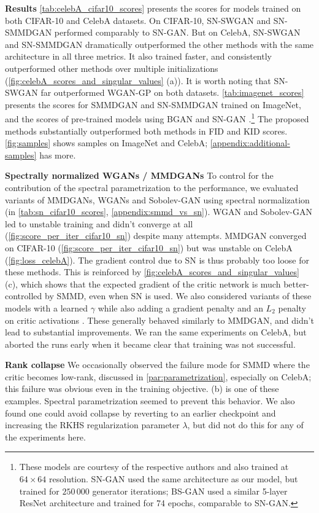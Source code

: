 \documentclass{article}
\let\citep\parencite
\begin{document}
\textbf{Results}
\cref{tab:celebA_cifar10_scores} presents the scores for models trained on both CIFAR-10 and CelebA datasets. On CIFAR-10,  SN-SWGAN and  SN-SMMDGAN performed comparably to SN-GAN. But on CelebA,
SN-SWGAN and SN-SMMDGAN dramatically outperformed the other methods with the same architecture in all three metrics. It also trained faster, and consistently outperformed other methods over multiple initializations (\cref{fig:celebA_scores_and_singular_values} (a)).
It is worth noting that SN-SWGAN far outperformed WGAN-GP on both datasets.
\cref{tab:imagenet_scores} presents the scores for SMMDGAN and SN-SMMDGAN trained on ImageNet,
and the scores of pre-trained models using BGAN \citep{began} and SN-GAN \citep{Miyato:2018}.\footnote{These models are courtesy of the respective authors and also trained at $64 \times 64$ resolution. SN-GAN used the same architecture as our model, but trained for $250\,000$ generator iterations; BS-GAN used a similar 5-layer ResNet architecture and trained for 74 epochs, comparable to SN-GAN.}
The proposed methods substantially outperformed both methods in FID and KID scores.
\cref{fig:samples} shows samples on ImageNet and CelebA;
\cref{appendix:additional-samples} has more.

\textbf{Spectrally normalized WGANs / MMDGANs}
To control for the contribution of the spectral parametrization to the performance,
we evaluated variants of MMDGANs, WGANs and Sobolev-GAN using spectral normalization
(in \cref{tab:sn_cifar10_scores}, \cref{appendix:smmd_vs_sn}).
WGAN and Sobolev-GAN led to unstable training and didn't converge at all (\cref{fig:score_per_iter_cifar10_sn}) despite many attempts.
MMDGAN converged on CIFAR-10 (\cref{fig:score_per_iter_cifar10_sn})  but was unstable on CelebA (\cref{fig:loss_celebA}).
The gradient control due to SN is thus probably too loose for these methods.
This is reinforced by \cref{fig:celebA_scores_and_singular_values} (c),
which shows that the expected gradient of the critic network
is much better-controlled by SMMD, even when SN is used.
We also considered variants of these models with a learned $\gamma$
while also adding a gradient penalty and an $L_2$ penalty on critic activations \citep[footnote 19]{Binkowski:2018}.
These generally behaved similarly to MMDGAN, and didn't lead to substantial improvements.
We ran the same experiments on CelebA,
but aborted the runs early when it became clear that training was not successful.


\textbf{Rank collapse}
We occasionally observed the failure mode for SMMD where the critic becomes low-rank,
discussed in \cref{par:parametrization},
especially on CelebA;
this failure was obvious even in the training objective.
 (b) is one of these examples.
Spectral parametrization seemed to prevent this behavior.
We also found one could avoid collapse by reverting to an earlier checkpoint
and increasing the RKHS regularization parameter $\lambda$,
but did not do this for any of the experiments here.
\end{document}
